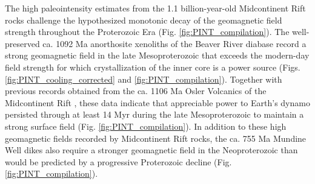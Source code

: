 \documentclass[9pt,twocolumn,twoside,lineno]{pnas-new}
\begin{document}
The high paleointensity estimates from the 1.1 billion-year-old Midcontinent Rift rocks challenge the hypothesized monotonic decay of the geomagnetic field strength throughout the Proterozoic Era (Fig. \ref{fig:PINT_compilation}). The well-preserved ca. 1092 Ma anorthosite xenoliths of the Beaver River diabase record a strong geomagnetic field in the late Mesoproterozoic that exceeds the modern-day field strength for which crystallization of the inner core is a power source (Figs. \ref{fig:PINT_cooling_corrected} and \ref{fig:PINT_compilation}). Together with previous records obtained from the ca. 1106 Ma Osler Volcanics of the Midcontinent Rift \cite{Sprain2018a}, these data indicate that appreciable power to Earth's dynamo persisted through at least 14 Myr during the late Mesoproterozoic to maintain a strong surface field (Fig. \ref{fig:PINT_compilation}). In addition to these high geomagnetic fields recorded by Midcontinent Rift rocks, the ca. 755 Ma Mundine Well dikes \cite{Lloyd2021b} also require a stronger geomagnetic field in the Neoproterozoic than would be predicted by a progressive Proterozoic decline (Fig. \ref{fig:PINT_compilation}). 
\end{document}
